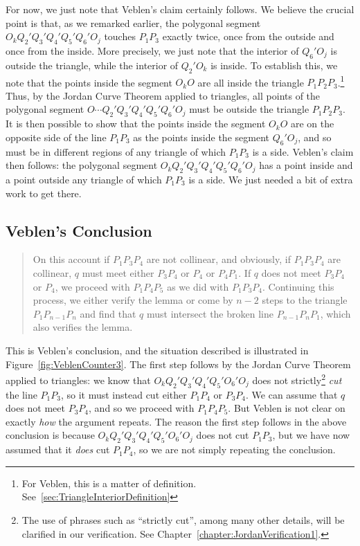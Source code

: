 For now, we just note that Veblen's claim certainly follows. We believe the crucial point is that, as we remarked earlier, the polygonal segment $O_kQ_2'Q_3'Q_4'Q_5'Q_6'O_j$ touches $P_1P_3$ exactly twice, once from the outside and once from the inside. More precisely, we just note that the interior of $Q_6'O_j$ is outside the triangle, while the interior of $Q_2'O_k$ is inside. To establish this, we note that the points inside the segment $O_kO$ are all inside the triangle $P_1P_2P_3$.\footnote{For Veblen, this is a matter of definition. See~\ref{sec:TriangleInteriorDefinition}} Thus, by the Jordan Curve Theorem applied to triangles, all points of the polygonal segment $O\cdots Q_2'Q_3'Q_4'Q_5'Q_6'O_j$ must be outside the triangle $P_1P_2P_3$. It is then possible to show that the points inside the segment $O_kO$ are on the opposite side of the line $P_1P_3$ as the points inside the segment $Q_6'O_j$, and so must be in different regions of any triangle of which $P_1P_3$ is a side. Veblen's claim then follows: the polygonal segment $O_kQ_2'Q_3'Q_4'Q_5'Q_6'O_j$ has a point inside and a point outside any triangle of which $P_1P_3$ is a side. We just needed a bit of extra work to get there.

\subsection{Veblen's Conclusion}
\begin{quote}On this account if $P_1P_3P_4$ are not collinear, and obviously, if $P_1P_3P_4$ are collinear, $q$ must meet either $P_3P_4$ or $P_4$ or $P_4P_1$. If $q$ does not meet $P_3P_4$ or $P_4$, we proceed with $P_1P_4P_5$ as we did with $P_1P_3P_4$. Continuing this process, we either verify the lemma or come by $n-2$ steps to the triangle $P_1P_{n-1}P_n$ and find that $q$ must intersect the broken line $P_{n-1}P_nP_1$, which also verifies the lemma.\end{quote}

This is Veblen's conclusion, and the situation described is illustrated in Figure~\ref{fig:VeblenCounter3}. The first step follows by the Jordan Curve Theorem applied to triangles: we know that $O_kQ_2'Q_3'Q_4'Q_5'O_6'O_j$ does not strictly\footnote{The use of phrases such as ``strictly cut'', among many other details, will be clarified in our verification. See Chapter~\ref{chapter:JordanVerification1}.} \emph{cut} the line $P_1P_3$, so it must instead cut either $P_1P_4$ or $P_3P_4$. We can assume that $q$ does not meet $P_3P_4$, and so we proceed with $P_1P_4P_5$. But Veblen is not clear on exactly \emph{how} the argument repeats. The reason the first step follows in the above conclusion is because $O_kQ_2'Q_3'Q_4'Q_5'O_6'O_j$ does not cut $P_1P_3$, but we have now assumed that it \emph{does} cut $P_1P_4$, so we are not simply repeating the conclusion. 

